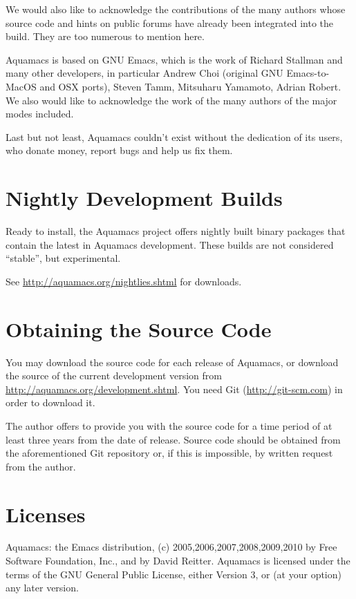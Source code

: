 \documentclass[11pt,letterpaper]{article}
\begin{document}
We would also like to acknowledge the contributions of the many authors 
whose source code and hints on public forums have already been
integrated into the build.  They are too numerous to mention here.

Aquamacs is based on GNU Emacs, which is the work of Richard Stallman
and many other developers, in particular Andrew Choi (original GNU
Emacs-to-MacOS and OSX ports), Steven Tamm, Mitsuharu Yamamoto, Adrian Robert. We also would like to acknowledge the work
of the many authors of the major modes included.

Last but not least, Aquamacs couldn't exist without the dedication of
its users, who donate money, report bugs and help us fix them.

\section {Nightly Development Builds}

Ready to install, the Aquamacs project offers nightly built binary
packages that contain the latest in Aquamacs development. These builds
are not considered ``stable'', but experimental.

See \url{http://aquamacs.org/nightlies.shtml} for downloads.


\section {Obtaining the Source Code}

You may download the source code for each release of Aquamacs, or
download the source of the current development version from
\url{http://aquamacs.org/development.shtml}.  You need Git (\url{http://git-scm.com}) in order to download it.

The author offers  to provide you with the source code for a time period of
at least three years from the date of release. Source code should be
obtained from the aforementioned Git repository or,
if this is impossible, by written request from the author.

\section {Licenses}

Aquamacs: the Emacs distribution, (c) 2005,2006,2007,2008,2009,2010 by Free Software
Foundation, Inc., and by David Reitter. Aquamacs is licensed under the
terms of the GNU General Public License, either Version 3, or (at your
option) any later version. 
\end{document}
